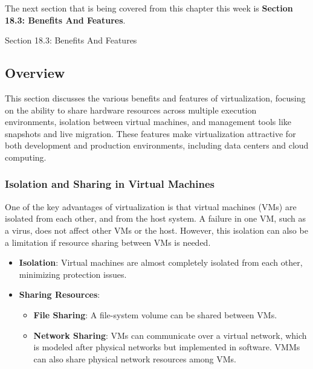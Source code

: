 The next section that is being covered from this chapter this week is \textbf{Section 18.3: Benefits And Features}.

\begin{notes}{Section 18.3: Benefits And Features}
    \subsection*{Overview}

    This section discusses the various benefits and features of virtualization, focusing on the ability to share hardware resources across multiple execution environments, isolation between virtual machines, 
    and management tools like snapshots and live migration. These features make virtualization attractive for both development and production environments, including data centers and cloud computing.
    
    \subsubsection*{Isolation and Sharing in Virtual Machines}
    
    One of the key advantages of virtualization is that virtual machines (VMs) are isolated from each other, and from the host system. A failure in one VM, such as a virus, does not affect other VMs or 
    the host. However, this isolation can also be a limitation if resource sharing between VMs is needed.
    
    \begin{highlight}
    
        \begin{itemize}
            \item \textbf{Isolation}: Virtual machines are almost completely isolated from each other, minimizing protection issues.
            \item \textbf{Sharing Resources}:
                \begin{itemize}
                    \item \textbf{File Sharing}: A file-system volume can be shared between VMs.
                    \item \textbf{Network Sharing}: VMs can communicate over a virtual network, which is modeled after physical networks but implemented in software. VMMs can also share physical network resources among VMs.
                \end{itemize}
        \end{itemize}
    

\end{highlight}
\end{notes}
